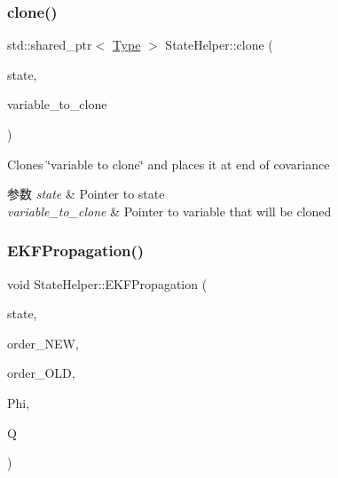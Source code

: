 \subsubsection{\texorpdfstring{clone()}{clone()}}
{\footnotesize\ttfamily std\+::shared\+\_\+ptr$<$ \hyperlink{classov__type_1_1Type}{Type} $>$ State\+Helper\+::clone (\begin{DoxyParamCaption}\item[{std\+::shared\+\_\+ptr$<$ \hyperlink{classov__msckf_1_1State}{State} $>$}]{state,  }\item[{std\+::shared\+\_\+ptr$<$ \hyperlink{classov__type_1_1Type}{ov\+\_\+type\+::\+Type} $>$}]{variable\+\_\+to\+\_\+clone }\end{DoxyParamCaption})\hspace{0.3cm}{\ttfamily [static]}}



Clones \char`\"{}variable to clone\char`\"{} and places it at end of covariance 


\begin{DoxyParams}{参数}
{\em state} & Pointer to state \\
\hline
{\em variable\+\_\+to\+\_\+clone} & Pointer to variable that will be cloned \\
\hline
\end{DoxyParams}
\mbox{\label{classov__msckf_1_1StateHelper_a31f92fdf5bac87bfc23d34334af7bd4d}} 
\subsubsection{\texorpdfstring{E\+K\+F\+Propagation()}{EKFPropagation()}}
{\footnotesize\ttfamily void State\+Helper\+::\+E\+K\+F\+Propagation (\begin{DoxyParamCaption}\item[{std\+::shared\+\_\+ptr$<$ \hyperlink{classov__msckf_1_1State}{State} $>$}]{state,  }\item[{const std\+::vector$<$ std\+::shared\+\_\+ptr$<$ \hyperlink{classov__type_1_1Type}{ov\+\_\+type\+::\+Type} $>$$>$ \&}]{order\+\_\+\+N\+EW,  }\item[{const std\+::vector$<$ std\+::shared\+\_\+ptr$<$ \hyperlink{classov__type_1_1Type}{ov\+\_\+type\+::\+Type} $>$$>$ \&}]{order\+\_\+\+O\+LD,  }\item[{const Eigen\+::\+Matrix\+Xd \&}]{Phi,  }\item[{const Eigen\+::\+Matrix\+Xd \&}]{Q }\end{DoxyParamCaption})\hspace{0.3cm}{\ttfamily [static]}}



